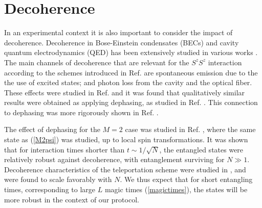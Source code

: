 \documentclass{WileyMSP-template}
\begin{document}
{{
\section{Decoherence}
\label{sec:decoherence}

In an experimental context it is also important to consider the impact of decoherence. Decoherence in Bose-Einstein condensates (BECs) and cavity quantum electrodynamics (QED) has been extensively studied in various works \cite{Anglin1997,Burt1997,Dalvit2000,Ferrini2011,Li2008,Li2009,Pellizzari1995,Putz2014,Sinatra1998,Schlosshauer2019}.  The main channels of decoherence that are relevant for the $ S^z S^z $ interaction according to the schemes introduced in Ref. \cite{pyrkov2013entanglement} are spontaneous emission due to the the use of excited states; and photon loss from the cavity and the optical fiber. These effects were studied in Ref. \cite{rosseau2014} and it was found that qualitatively similar results were obtained as applying dephasing, as studied in Ref. \cite{byrnes2013fractality}.  This connection to dephasing was more rigorously shown in Ref. \cite{ilo2024quantum}.

The effect of dephasing for the $M = 2$ case was studied in Ref. \cite{byrnes2013fractality}, where the same state as (\ref{M2psi}) was studied, up to local spin transformations. It was shown that for interaction times shorter than $ t \sim 1/\sqrt{N} $, the entangled states were relatively robust against decoherence, with entanglement surviving for $ N \gg 1 $. Decoherence characteristics of the teleportation scheme were studied in \cite{pyrkov2014quantum,pyrkov2014full}, and were found to scale favorably with $ N $. We thus expect that for short entangling times, corresponding to large $ L $ magic times (\ref{magictimes}), the states will be more robust in the context of our protocol.



}}
\end{document}
